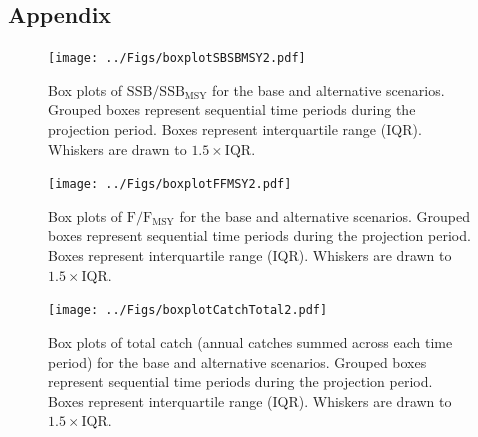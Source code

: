 \documentclass[12pt,english]{article}
\begin{document}
\begin{appendix}

\clearpage
\section*{Appendix}

\setcounter{figure}{0}
\renewcommand{\thefigure}{S\arabic{figure}}

%
% 
%
% 
%

\begin{figure}[!ht]
\begin{center}
\texttt{[image: ../Figs/boxplotSBSBMSY2.pdf]}
\end{center}
\begin{flushleft}
\caption{Box plots of $\mathrm{SSB/SSB_{MSY}}$ for the base and alternative scenarios. Grouped boxes represent sequential time periods during the projection period. Boxes represent interquartile range (IQR). Whiskers are drawn to $1.5\times\mathrm{IQR}$.}
\label{fig:boxplotSBSBMSY2}
\end{flushleft}
\end{figure}
\clearpage\begin{figure}[!ht]
\begin{center}
\texttt{[image: ../Figs/boxplotFFMSY2.pdf]}
\end{center}
\begin{flushleft}
\caption{Box plots of $\mathrm{F/F_{MSY}}$ for the base and alternative scenarios. Grouped boxes represent sequential time periods during the projection period. Boxes represent interquartile range (IQR). Whiskers are drawn to $1.5\times\mathrm{IQR}$.}
\label{fig:boxplotFFMSY2}
\end{flushleft}
\end{figure}
\clearpage\begin{figure}[!ht]
\begin{center}
\texttt{[image: ../Figs/boxplotCatchTotal2.pdf]}
\end{center}
\begin{flushleft}
\caption{Box plots of total catch (annual catches summed across each time period) for the base and alternative scenarios. Grouped boxes represent sequential time periods during the projection period. Boxes represent interquartile range (IQR). Whiskers are drawn to $1.5\times\mathrm{IQR}$.}
\label{fig:boxplotCatchTotal2}
\end{flushleft}

\end{figure}
\end{appendix}
\end{document}
